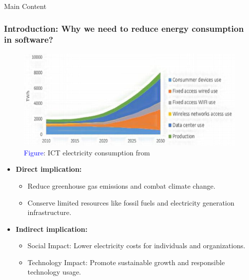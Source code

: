 \documentclass{beamer}
\begin{document}
\begin{frame}{Main Content}
\hypertarget{Intro_11}{}
\frametitle{Introduction: Why we need to reduce energy consumption in software?}

\begin{figure}
    \vspace*{-0.4cm} %
    \centering
    \includegraphics[width=.6\textwidth]{figures/Slide_1(ICT electricity consumption).png}
    \captionsetup{justification=centering} %
    \caption*{\scriptsize{\textcolor{blue}{Figure}: ICT electricity consumption from \cite{muthu2019green}}}
    \label{fig:ICT electricity consumption}
 \end{figure}
 
\begin{itemize}
    \vspace*{-0.75cm} %
    \item \textbf{\footnotesize Direct implication:}
    \begin{itemize}
        \item \footnotesize Reduce greenhouse gas emissions and combat climate change.
        \item \footnotesize Conserve limited resources like fossil fuels and electricity generation infrastructure.
    \end{itemize}
    
    \item \textbf{\footnotesize Indirect implication:}
    \begin{itemize}
        \item \footnotesize Social Impact: Lower electricity  costs for individuals and organizations.
        \item \footnotesize Technology Impact: Promote sustainable growth and responsible technology usage.
    \end{itemize}
\end{itemize}
\end{frame}
\end{document}

